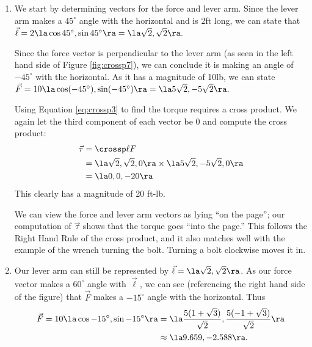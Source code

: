 {\begin{enumerate}
	\item We start by determining vectors for the force and lever arm. Since the lever arm makes a $45^\circ$ angle with the horizontal and is 2ft long, we can state that $\vec \ell = 2\la \cos 45^\circ,\sin 45^\circ\ra = \la \sqrt2,\sqrt2\ra.$
	
	Since the force vector is perpendicular to the lever arm (as seen in the left hand side of Figure \ref{fig:crossp7}), we can conclude it is making an angle of $-45^\circ$ with the horizontal. As it has a magnitude of 10lb, we can state $\vec F = 10\la \cos (-45^\circ), \sin(-45^\circ)\ra = \la 5\sqrt2,-5\sqrt2\ra.$
	
	Using Equation \eqref{eq:crossp3} to find the torque requires a cross product. We again let the third component of each vector be 0  and compute the cross product:
	\begin{align*}
	\vec\tau &= \crossp \ell F \\
				&= \la \sqrt2,\sqrt2,0\ra \times \la 5\sqrt2,-5\sqrt2,0\ra \\
				&= \la 0,0,-20\ra
	\end{align*}
	This clearly has a magnitude of 20 ft-lb.
	
	We can view the force and lever arm vectors as lying ``on the page''; our computation of $\vec\tau$ shows that the torque goes ``into the page.'' This follows the Right Hand Rule of the cross product, and it also matches well with the example of the wrench turning the bolt. Turning a bolt clockwise moves it in.
	
	\item		Our lever arm can still be represented by $\vec \ell = \la \sqrt2,\sqrt2\ra$. As our force vector makes a $60^\circ$ angle with $\vec \ell$, we can see (referencing the right hand side of the figure) that $\vec F$ makes a $-15^\circ$ angle with the horizontal. Thus 
	\begin{align*}
	\vec F = 10\la \cos-15^\circ,\sin-15^\circ\ra &= \la \frac{5(1+\sqrt3)}{\sqrt2},\frac{5(-1+\sqrt3)}{\sqrt2}\ra \\
	&\approx \la 9.659,-2.588\ra.\end{align*}
	

\end{enumerate}}
